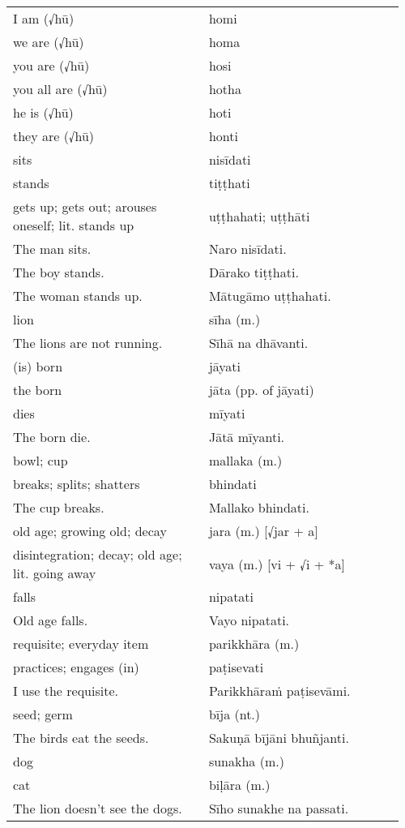 \documentclass[a5paper]{memoir}
\begin{document}
\begin{longtable}{L{0.48\linewidth} L{0.48\linewidth}}
I am (√hū) & homi\\[0pt]
we are (√hū) & homa\\[0pt]
you are (√hū) & hosi\\[0pt]
you all are (√hū) & hotha\\[0pt]
he is (√hū) & hoti\\[0pt]
they are (√hū) & honti\\[0pt]
sits & nisīdati\\[0pt]
stands & tiṭṭhati\\[0pt]
gets up; gets out; arouses oneself; lit. stands up & uṭṭhahati; uṭṭhāti\\[0pt]
The man sits. & Naro nisīdati.\\[0pt]
The boy stands. & Dārako tiṭṭhati.\\[0pt]
The woman stands up. & Mātugāmo uṭṭhahati.\\[0pt]
lion & sīha (m.)\\[0pt]
The lions are not running. & Sīhā na dhāvanti.\\[0pt]
(is) born & jāyati\\[0pt]
the born & jāta (pp. of jāyati)\\[0pt]
dies & mīyati\\[0pt]
The born die. & Jātā mīyanti.\\[0pt]
bowl; cup & mallaka (m.)\\[0pt]
breaks; splits; shatters & bhindati\\[0pt]
The cup breaks. & Mallako bhindati.\\[0pt]
old age; growing old; decay & jara (m.) [√jar + a]\\[0pt]
disintegration; decay; old age; lit. going away & vaya (m.) [vi + √i + *a]\\[0pt]
falls & nipatati\\[0pt]
Old age falls. & Vayo nipatati.\\[0pt]
requisite; everyday item & parikkhāra (m.)\\[0pt]
practices; engages (in) & paṭisevati\\[0pt]
I use the requisite. & Parikkhāraṁ paṭisevāmi.\\[0pt]
seed; germ & bīja (nt.)\\[0pt]
The birds eat the seeds. & Sakuṇā bījāni bhuñjanti.\\[0pt]
dog & sunakha (m.)\\[0pt]
cat & biḷāra (m.)\\[0pt]
The lion doesn't see the dogs. & Sīho sunakhe na passati.\\[0pt]

\end{longtable}
\end{document}
